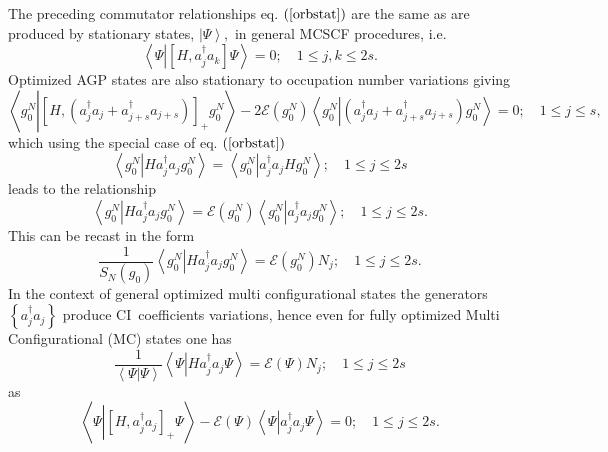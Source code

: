 \documentclass[titlepage]{article}%
\begin{document}
The preceding commutator relationships eq. $\left(  \ref{orbstat}\right)  $
are the same as are produced by stationary states, $\left\vert \Psi
\right\rangle ,$ in general MCSCF procedures, i.e.
\begin{equation}
\left\langle \Psi\left\vert \left[  H,a_{j}^{\dagger}a_{k}\right]
\Psi\right.  \right\rangle =0;\quad1\leq j,k\leq2s.
\end{equation}
Optimized AGP states are also stationary to occupation number variations
giving
\begin{equation}
\left\langle g_{0}^{N}\left\vert \left[  H,\left(  a_{j}^{\dagger}%
a_{j}+a_{j+s}^{\dagger}a_{j+s}\right)  \right]  _{+}g_{0}^{N}\right.
\right\rangle -2\mathcal{E}\left(  g_{0}^{N}\right)  \left\langle g_{0}%
^{N}\left\vert \left(  a_{j}^{\dagger}a_{j}+a_{j+s}^{\dagger}a_{j+s}\right)
g_{0}^{N}\right.  \right\rangle =0;\quad1\leq j\leq s,
\end{equation}
which using the special case of eq. $\left(  \ref{orbstat}\right)  $
\begin{equation}
\left\langle g_{0}^{N}\left\vert Ha_{j}^{\dagger}a_{j}g_{0}^{N}\right.
\right\rangle =\left\langle g_{0}^{N}\left\vert a_{j}^{\dagger}a_{j}Hg_{0}%
^{N}\right.  \right\rangle ;\quad1\leq j\leq2s
\end{equation}
leads to the relationship
\begin{equation}
\left\langle g_{0}^{N}\left\vert Ha_{j}^{\dagger}a_{j}g_{0}^{N}\right.
\right\rangle =\mathcal{E}\left(  g_{0}^{N}\right)  \left\langle g_{0}%
^{N}\left\vert a_{j}^{\dagger}a_{j}g_{0}^{N}\right.  \right\rangle ;\quad1\leq
j\leq2s.
\end{equation}
This can be recast in the form
\begin{equation}
\frac{1}{S_{N}\left(  g_{0}\right)  }\left\langle g_{0}^{N}\left\vert
Ha_{j}^{\dagger}a_{j}g_{0}^{N}\right.  \right\rangle =\mathcal{E}\left(
g_{0}^{N}\right)  N_{j};\quad1\leq j\leq2s. \label{occnumstat}%
\end{equation}
In the context of general optimized multi configurational states the
generators $\left\{  a_{j}^{\dagger}a_{j}\right\}  $ produce CI\ coefficients
variations, hence even for fully optimized Multi Configurational (MC) states
one has
\begin{equation}
\frac{1}{\left\langle \left.  \Psi\right\vert \Psi\right\rangle }\left\langle
\Psi\left\vert Ha_{j}^{\dagger}a_{j}\Psi\right.  \right\rangle =\mathcal{E}%
\left(  \Psi\right)  N_{j};\quad1\leq j\leq2s \label{MCocc}%
\end{equation}
as
\begin{equation}
\left\langle \Psi\left\vert \left[  H,a_{j}^{\dagger}a_{j}\right]  _{+}%
\Psi\right.  \right\rangle -\mathcal{E}\left(  \Psi\right)  \left\langle
\Psi\left\vert a_{j}^{\dagger}a_{j}\Psi\right.  \right\rangle =0;\quad1\leq
j\leq2s.
\end{equation}
\end{document}
